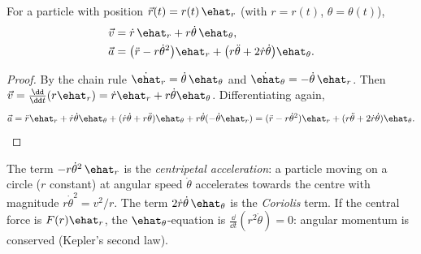 \begin{theorem}\label{thm:polaracc}
For a particle with position $\vec r(t)=r(t)\,\ehat_r$ (with $r=r(t)$, $\theta=\theta(t)$),
\begin{align*}
\vec v&=\dot r\,\ehat_r+r\dot\theta\,\ehat_\theta,\\
\vec a&=\bigl(\ddot r-r\dot\theta^2\bigr)\ehat_r+\bigl(r\ddot\theta+2\dot r\dot\theta\bigr)\ehat_\theta .
\end{align*}
\end{theorem}

\begin{proof}
By the chain rule $\dot{\ehat}_r=\dot\theta\,\ehat_\theta$ and $\dot{\ehat}_\theta=-\dot\theta\,\ehat_r$. Then $\vec v=\frac{\dd}{\dd t}(r\ehat_r)=\dot r\ehat_r+r\dot\theta\ehat_\theta$. Differentiating again,
\[
\vec a=\ddot r\ehat_r+\dot r\dot\theta\ehat_\theta+(\dot r\dot\theta+r\ddot\theta)\ehat_\theta+r\dot\theta(-\dot\theta\ehat_r)=(\ddot r-r\dot\theta^2)\ehat_r+(r\ddot\theta+2\dot r\dot\theta)\ehat_\theta .\qedhere
\]
\end{proof}

\begin{intuition}
The term $-r\dot\theta^2\,\ehat_r$ is the \emph{centripetal acceleration}: a particle moving on a circle ($r$ constant) at angular speed $\dot\theta$ accelerates towards the centre with magnitude $r\dot\theta^2=v^2/r$. The term $2\dot r\dot\theta\,\ehat_\theta$ is the \emph{Coriolis} term. If the central force is $F(r)\ehat_r$, the $\ehat_\theta$-equation is $\frac{\dd}{\dd t}(r^2\dot\theta)=0$: angular momentum is conserved (Kepler's second law).
\end{intuition}

